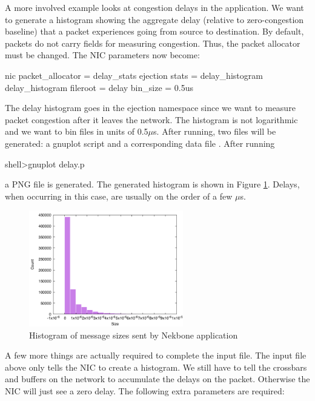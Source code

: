 A more involved example looks at congestion delays in the application.
We want to generate a histogram showing the aggregate delay (relative to zero-congestion baseline) that a packet experiences
going from source to destination.
By default, packets do not carry fields for measuring congestion. 
Thus, the packet allocator must be changed.
The NIC parameters now become:

\begin{ViFile}
nic {
 packet_allocator = delay_stats
 ejection {
  stats = delay_histogram
  delay_histogram {
   fileroot = delay
   bin_size = 0.5us
  }
 }
}
\end{ViFile}
The delay histogram goes in the ejection namespace since we want to measure packet congestion after it leaves the network.
The histogram is not logarithmic and we want to bin files in units of 0.5$\mu$s.
After running, two files will be generated: a gnuplot script and a corresponding data file .
After running
\begin{ShellCmd}
shell>gnuplot delay.p 
\end{ShellCmd}
a PNG file  is generated.
The generated histogram is shown in Figure \ref{fig:nekboneDelayHistogram}. 
Delays, when occurring in this case, are usually on the order of a few $\mu$s.

\begin{figure}
\centering
\includegraphics[width=0.6\textwidth]{figures/delayHistogramNekbone}
\caption{Histogram of message sizes sent by Nekbone application}
\label{fig:nekboneDelayHistogram}
\end{figure}

A few more things are actually required to complete the input file.
The input file above only tells the NIC to create a histogram.
We still have to tell the crossbars and buffers on the network to accumulate the delays on the packet.
Otherwise the NIC will just see a zero delay.
The following extra parameters are required:

